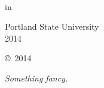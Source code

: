\vfill

\begin{center}
     \MakeUppercase{\thesisDegree}\\
     \vspace{-2mm} 
     in\\
     \vspace{-2mm} 
     \MakeUppercase{\thesisDept}
\end{center}


\vfill

\begin{center}
    Portland State University\\
    \vspace{-2mm} 
    2014
\end{center}

\cleardoublepage    

\begin{center}
    \vspace*{2.5 in}
    \copyright~2014 \thesisAuthor
\end{center}

\cleardoublepage


\vspace*{\fill}
{\hfill\sffamily\itshape Something fancy.}


\rmfamily
\normalfont




\clearpage
 


\tableofcontents



\clearpage
\listoftables

\clearpage
\listoffigures


